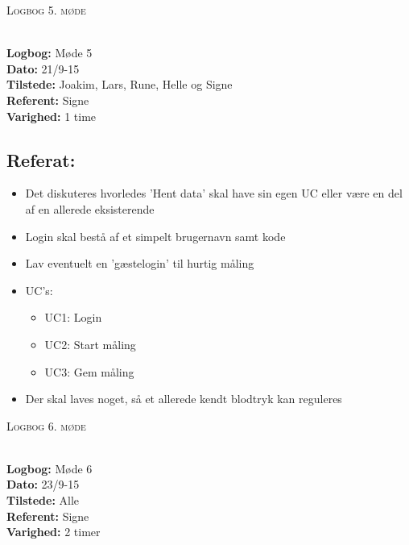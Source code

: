 \documentclass[a4paper,11pt,oneside]{memoir}
\begin{document}
\newpage

\begin{center} 
\huge{\textsc{Logbog 5. møde}}
\end{center}

\textbf{ }
\\
\textbf{Logbog:} Møde 5
\\
\textbf{Dato:} 21/9-15
\\
\textbf{Tilstede:} Joakim, Lars, Rune, Helle og Signe 
\\
\textbf{Referent:} Signe
\\
\textbf{Varighed:} 1 time
\\

\subsection{Referat:}
\begin{itemize}
\item Det diskuteres hvorledes 'Hent data' skal have sin egen UC eller være en del af en allerede eksisterende 
\item Login skal bestå af et simpelt brugernavn samt kode 
\item Lav eventuelt en 'gæstelogin' til hurtig måling 
\item UC's:
\begin{itemize}
\item UC1: Login 
\item UC2: Start måling
\item UC3: Gem måling
\end{itemize}
\item Der skal laves noget, så et allerede kendt blodtryk kan reguleres 
\end{itemize}
\newpage


\begin{center} 
\huge{\textsc{Logbog 6. møde}}
\end{center}

\textbf{ }
\\
\textbf{Logbog:} Møde 6
\\
\textbf{Dato:} 23/9-15
\\
\textbf{Tilstede:} Alle
\\
\textbf{Referent:} Signe
\\
\textbf{Varighed:} 2 timer
\\
\end{document}
